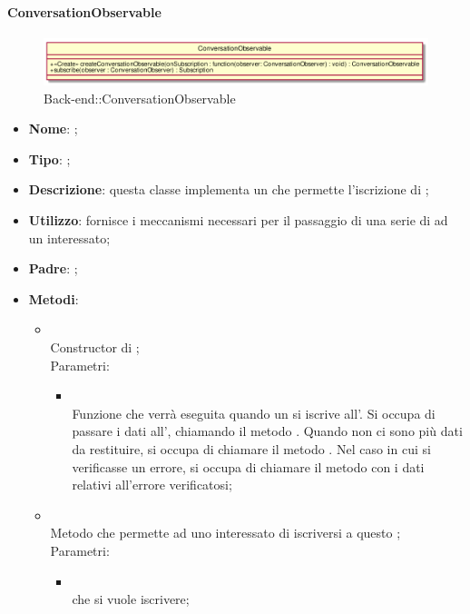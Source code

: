 \hypertarget{ConversationObservable_label}{\paragraph{ConversationObservable}}
\begin{figure}[h]
	\centering
	\includegraphics[width=\textwidth,height=\textheight,keepaspectratio]{images/ClassConversationObservable.png}
	\caption{Back-end::ConversationObservable}
\end{figure}
\begin{itemize}
	\item \textbf{Nome}: ;
	\item \textbf{Tipo}: ;
	\item \textbf{Descrizione}: questa classe implementa un  che permette l'iscrizione di ;
	\item \textbf{Utilizzo}: fornisce i meccanismi necessari per il passaggio di una serie di  ad un  interessato;
	\item \textbf{Padre}: ;
	\item \textbf{Metodi}:
	\begin{itemize}
		\item[]  \\
		Constructor di ;\\
		Parametri:
		\begin{itemize}
			\item {} \\
			Funzione che verrà eseguita quando un  si iscrive all'. Si occupa di passare i dati all', chiamando il metodo . Quando non ci sono più dati da restituire, si occupa di chiamare il metodo . Nel caso in cui si verificasse un errore, si occupa di chiamare il metodo  con i dati relativi all'errore verificatosi;
		\end{itemize}
		\item[]  \\
		Metodo che permette ad uno  interessato di iscriversi a questo ;\\
		Parametri:
		\begin{itemize}
			\item {} \\
			 che si vuole iscrivere;
		\end{itemize}
	\end{itemize}
\end{itemize}
\FloatBarrier

